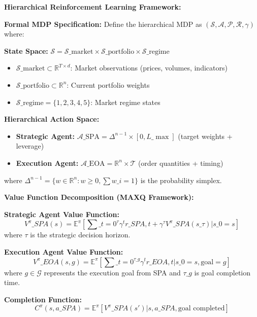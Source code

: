 \documentclass[11pt,a4paper]{article}
\begin{document}
\textbf{Hierarchical Reinforcement Learning Framework:}

\textbf{Formal MDP Specification:}
Define the hierarchical MDP as $(\mathcal{S}, \mathcal{A}, \mathcal{P}, \mathcal{R}, \gamma)$ where:

\textbf{State Space:} $\mathcal{S} = \mathcal{S}\_{\text{market}} \times \mathcal{S}\_{\text{portfolio}} \times \mathcal{S}\_{\text{regime}}$
\begin{itemize}
\item $\mathcal{S}\_{\text{market}} \subset \mathbb{R}^{T \times d}$: Market observations (prices, volumes, indicators)
\item $\mathcal{S}\_{\text{portfolio}} \subset \mathbb{R}^n$: Current portfolio weights
\item $\mathcal{S}\_{\text{regime}} = \{1,2,3,4,5\}$: Market regime states

\end{itemize}
\textbf{Hierarchical Action Space:}
\begin{itemize}
\item \textbf{Strategic Agent:} $\mathcal{A}\_{\text{SPA}} = \Delta^{n-1} \times [0, L\_{\max}]$ (target weights + leverage)
\item \textbf{Execution Agent:} $\mathcal{A}\_{\text{EOA}} = \mathbb{R}^n \times \mathcal{T}$ (order quantities + timing)

\end{itemize}
where $\Delta^{n-1} = \{w \in \mathbb{R}^n: w \geq 0, \sum w\_i = 1\}$ is the probability simplex.

\textbf{Value Function Decomposition (MAXQ Framework):}

\textbf{Strategic Agent Value Function:}
\begin{equation}
V^{\pi}\_{SPA}(s) = \mathbb{E}^{\pi}\left[\sum\_{t=0}^{\tau} \gamma^t r\_{SPA,t} + \gamma^{\tau} V^{\pi}\_{SPA}(s\_{\tau}) \Big| s\_0 = s\right]
\end{equation}
where $\tau$ is the strategic decision horizon.

\textbf{Execution Agent Value Function:}
\begin{equation}
V^{\pi}\_{EOA}(s, g) = \mathbb{E}^{\pi}\left[\sum\_{t=0}^{\tau\_g} \gamma^t r\_{EOA,t} \Big| s\_0 = s, \text{goal} = g\right]
\end{equation}
where $g \in \mathcal{G}$ represents the execution goal from SPA and $\tau\_g$ is goal completion time.

\textbf{Completion Function:}
\begin{equation}
C^{\pi}(s, a\_{SPA}) = \mathbb{E}^{\pi}[V^{\pi}\_{SPA}(s') | s, a\_{SPA}, \text{goal completed}]
\end{equation}
\end{document}
